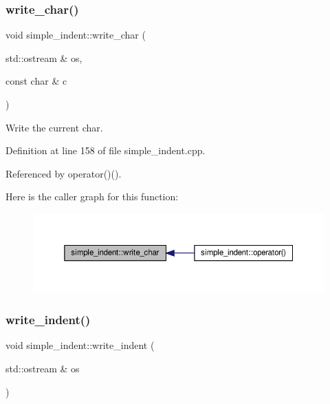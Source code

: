 \subsubsection{\texorpdfstring{write\+\_\+char()}{write\_char()}}
{\footnotesize\ttfamily void simple\+\_\+indent\+::write\+\_\+char (\begin{DoxyParamCaption}\item[{std\+::ostream \&}]{os,  }\item[{const char \&}]{c }\end{DoxyParamCaption})\hspace{0.3cm}{\ttfamily [private]}}



Write the current char. 



Definition at line 158 of file simple\+\_\+indent.\+cpp.



Referenced by operator()().

Here is the caller graph for this function\+:
\nopagebreak
\begin{figure}[H]
\begin{center}
\leavevmode
\includegraphics[width=350pt]{db/d73/classsimple__indent_a945ebea4ab143178d2664fa746cb0228_icgraph}
\end{center}
\end{figure}
\mbox{\label{classsimple__indent_aad9458b42a0de8b0f22dcf9c171b935f}} 
\subsubsection{\texorpdfstring{write\+\_\+indent()}{write\_indent()}}
{\footnotesize\ttfamily void simple\+\_\+indent\+::write\+\_\+indent (\begin{DoxyParamCaption}\item[{std\+::ostream \&}]{os }\end{DoxyParamCaption})\hspace{0.3cm}{\ttfamily [private]}}



